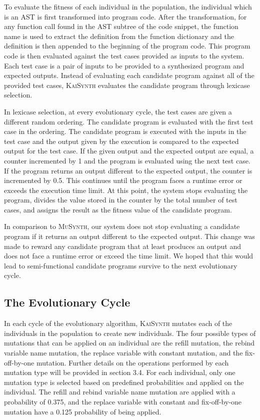 \documentclass{article}
\begin{document}
To evaluate the fitness of each individual in the population, the individual which is an AST is first transformed into program code. After the transformation, for any function call found in the AST subtree of the code snippet, the function name is used to extract the definition from the function dictionary and the definition is then appended to the beginning of the program code. This program code is then evaluated against the test cases provided as inputs to the system. Each test case is a pair of inputs to be provided to a synthesized program and expected outputs. Instead of evaluating each candidate program against all of the provided test cases, \textsc{KaiSynth} evaluates the candidate program through lexicase selection.

In lexicase selection, at every evolutionary cycle, the test cases are given a different random ordering. The candidate program is evaluated with the first test case in the ordering. The candidate program is executed with the inputs in the test case and the output given by the execution is compared to the expected output for the test case. If the given output and the expected output are equal, a counter incremented by 1 and the program is evaluated using the next test case. If the program returns an output different to the expected output, the counter is incremented by 0.5. This continues until the program faces a runtime error or exceeds the execution time limit. At this point, the system stops evaluating the program, divides the value stored in the counter by the total number of test cases, and assigns the result as the fitness value of the candidate program. 

In comparison to \textsc{MuSynth}, our system does not stop evaluating a candidate program if it returns an output different to the expected output. This change was made to reward any candidate program that at least produces an output and does not face a runtime error or exceed the time limit. We hoped that this would lead to semi-functional candidate programs survive to the next evolutionary cycle. 

\subsection{The Evolutionary Cycle}

In each cycle of the evolutionary algorithm, \textsc{KaiSynth} mutates each of the individuals in the population to create new individuals. The four possible types of mutations that can be applied on an individual are the refill mutation, the rebind variable name mutation, the replace variable with constant mutation, and the fix-off-by-one mutation. Further details on the operations performed by each mutation type will be provided in section 3.4. For each individual, only one mutation type is selected based on predefined probabilities and applied on the individual. The refill and rebind variable name mutation are applied with a probability of 0.375, and the replace variable with constant and fix-off-by-one mutation have a 0.125 probability of being applied.
\end{document}
